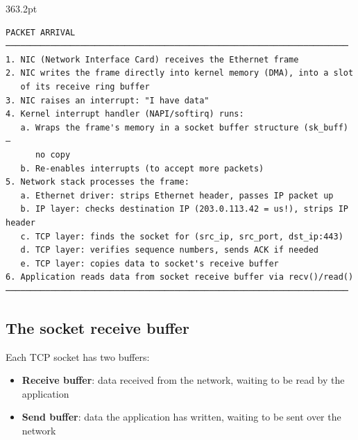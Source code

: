 \begin{diagrambox}[short]{363.2pt}
\begin{Verbatim}[fontsize=\fontsize{9.0}{8.55}\selectfont]
PACKET ARRIVAL
─────────────────────────────────────────────────────────────────────
1. NIC (Network Interface Card) receives the Ethernet frame
2. NIC writes the frame directly into kernel memory (DMA), into a slot
   of its receive ring buffer
3. NIC raises an interrupt: "I have data"
4. Kernel interrupt handler (NAPI/softirq) runs:
   a. Wraps the frame's memory in a socket buffer structure (sk_buff) —
      no copy
   b. Re-enables interrupts (to accept more packets)
5. Network stack processes the frame:
   a. Ethernet driver: strips Ethernet header, passes IP packet up
   b. IP layer: checks destination IP (203.0.113.42 = us!), strips IP header
   c. TCP layer: finds the socket for (src_ip, src_port, dst_ip:443)
   d. TCP layer: verifies sequence numbers, sends ACK if needed
   e. TCP layer: copies data to socket's receive buffer
6. Application reads data from socket receive buffer via recv()/read()
─────────────────────────────────────────────────────────────────────
\end{Verbatim}
\end{diagrambox}

\subsection*{The socket receive buffer}\label{26-network-stack-flow:the-socket-receive-buffer}

Each TCP socket has two buffers:

\begin{itemize}
\tightlist
\item
  \textbf{Receive buffer}: data received from the network, waiting to be read by the application
\item
  \textbf{Send buffer}: data the application has written, waiting to be sent over the network
\end{itemize}

\begin{codebox}[short]

\begin{Shaded}
\begin{Highlighting}[]
\end{Highlighting}
\end{Shaded}

\end{codebox}

